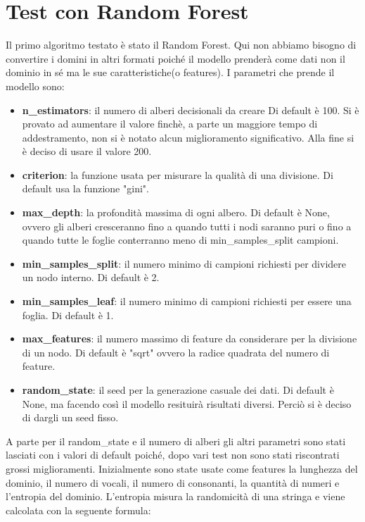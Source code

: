 \documentclass[12pt,a4paper,openright,twoside]{book}
\begin{document}
\section{Test con Random Forest}

Il primo algoritmo testato è stato il Random Forest.
Qui non abbiamo bisogno di convertire i domini in
altri formati poiché il modello prenderà
come dati non il dominio in sé ma le sue caratteristiche(o features).
I parametri che prende il modello sono:
\begin{itemize}
    \item \textbf{n\_estimators}: il numero di alberi decisionali da creare
    Di default è 100. Si è provato ad aumentare il valore finchè, a parte un maggiore
    tempo di addestramento, non si è notato alcun miglioramento significativo.
    Alla fine si è deciso di usare il valore 200.
    \item \textbf{criterion}: la funzione usata per misurare la qualità di una divisione.
    Di default usa la funzione "gini".
    \item \textbf{max\_depth}: la profondità massima di ogni albero.
    Di default è None, ovvero gli alberi cresceranno fino a quando
    tutti i nodi saranno puri o fino a quando tutte le foglie
    conterranno meno di min\_samples\_split campioni.
    \item \textbf{min\_samples\_split}: il numero minimo di campioni richiesti
    per dividere un nodo interno. Di default è 2.
    \item \textbf{min\_samples\_leaf}: il numero minimo di campioni richiesti
    per essere una foglia. Di default è 1.
    \item \textbf{max\_features}: il numero massimo di feature da considerare
    per la divisione di un nodo. Di default è "sqrt" ovvero la radice quadrata
    del numero di feature.
    \item \textbf{random\_state}: il seed per la generazione casuale dei dati.
    Di default è None, ma facendo così il modello resituirà risultati diversi.
    Perciò si è deciso di dargli un seed fisso.
\end{itemize}
A parte per il random\_state e il numero di alberi gli altri parametri sono stati lasciati
con i valori di default poiché, dopo vari test non sono stati riscontrati grossi miglioramenti.
Inizialmente sono state usate come features la lunghezza del dominio, il numero di vocali,
il numero di consonanti, la quantità di numeri e l'entropia del dominio.
L'entropia misura la randomicità di una stringa e viene calcolata con la seguente formula:
\end{document}
